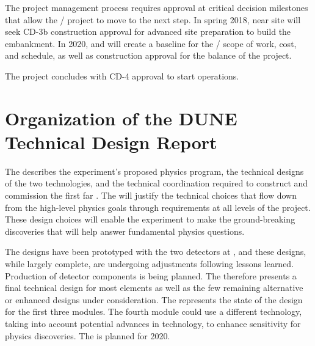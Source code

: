 
The  project management process requires approval at critical decision milestones that allow the / project to move to the next step. In spring 2018,   near site  will seek CD-3b construction approval for advanced site preparation to build the embankment. In 2020,  and  will create a baseline for the / scope of work, cost, and schedule, as well as construction approval for the balance of the project. 

The project concludes with CD-4 approval to start operations.

\section{Organization of the DUNE Technical Design Report}


The   describes the experiment's proposed physics program, the 
technical designs of the two   technologies, and the technical coordination required to construct and commission the first far .
The  will 
justify the technical choices that flow down from the high-level physics goals through requirements at all levels of the project. These design choices will enable the  experiment to make the ground-breaking discoveries that will help answer 
fundamental physics questions. 

The   designs have been prototyped with the two  detectors at , and these designs, while largely complete, are undergoing adjustments following lessons learned. Production of detector components is being planned. 
The   therefore presents a final technical design for most elements as well as the few remaining alternative or enhanced designs under consideration. The  represents the state of the design for the first three   modules.
The fourth module could use a different \lartpc technology, taking into account  potential advances in technology, to enhance sensitivity for physics discoveries.  The   is planned for 2020.

